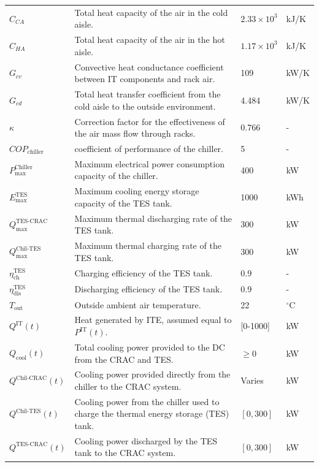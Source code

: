 \documentclass[lettersize,journal]{IEEEtran}
\begin{document}
{{\begin{longtable}{p{} p{} p{} p{}}
$C_{CA}$ & Total heat capacity of the air in the cold aisle. & $2.33 \times 10^3$ & kJ/K \\
$C_{HA}$ & Total heat capacity of the air in the hot aisle. & $1.17 \times 10^3$ & kJ/K \\
$G_{cv}$ & Convective heat conductance coefficient between IT components and rack air. & 109 &kW/K \\
$G_{cd}$ & Total heat transfer coefficient from the cold aisle to the outside environment. & 4.484 &kW/K \\
$\kappa$ & Correction factor for the effectiveness of the air mass flow through racks. & 0.766 & - \\
$COP_{\mathrm{chiller}}$ & coefficient of performance of the chiller. & 5 & - \\
$P^{\mathrm{Chiller}}_{\mathrm{max}}$ & Maximum electrical power consumption capacity of the chiller. & 400 &kW \\
$E^{\mathrm{TES}}_{\mathrm{max}}$ & Maximum cooling energy storage capacity of the TES tank. & 1000 &kWh \\
$Q^{\mathrm{TES}\text{-}\mathrm{CRAC}}_{\mathrm{max}}$ & Maximum thermal discharging rate of the TES tank. & 300 &kW \\
$Q^{\mathrm{Chil}\text{-}\mathrm{TES}}_{\mathrm{max}}$ & Maximum thermal charging rate of the TES tank. & 300 &kW \\
$\eta^{\mathrm{TES}}_{\mathrm{ch}}$ & Charging efficiency of the TES tank. & 0.9 & - \\
$\eta^{\mathrm{TES}}_{\mathrm{dis}}$ & Discharging efficiency of the TES tank. & 0.9 & - \\
$T_{\mathrm{out}}$ & Outside ambient air temperature. & 22 & $^{\circ}$C \\
$Q^{\mathrm{IT}}(t)$ & Heat generated by ITE, assumed equal to $P^{\mathrm{IT}}(t)$. & [0-1000] &kW \\
$Q_{\mathrm{cool}}(t)$ & Total cooling power provided to the DC from the CRAC and TES. & $\geq 0$ &kW \\
$Q^{\mathrm{Chil}\text{-}\mathrm{CRAC}}(t)$ & Cooling power provided directly from the chiller to the CRAC system. & Varies &kW \\
$Q^{\mathrm{Chil}\text{-}\mathrm{TES}}(t)$ & Cooling power from the chiller used to charge the thermal energy storage (TES) tank. & $[0, 300]$ &kW \\
$Q^{\mathrm{TES}\text{-}\mathrm{CRAC}}(t)$ & Cooling power discharged by the TES tank to the CRAC system. & $[0, 300]$ &kW \\

\end{longtable}}}
\end{document}
